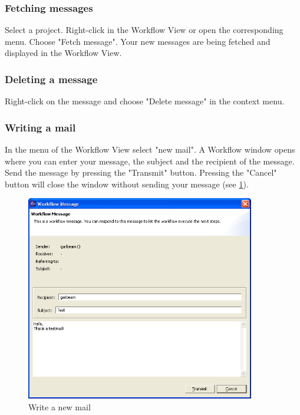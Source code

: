 \subsubsection {Fetching messages}

Select a project. Right-click in the Workflow View or open the corresponding menu. Choose "Fetch message".
Your new messages are being fetched and displayed in the Workflow View.


\subsubsection{Deleting a message}

Right-click on the message and choose "Delete message" in the context menu.


\subsubsection{Writing a mail}

In the menu of the Workflow View select "new mail". A Workflow window opens where
you can enter your message, the subject and the recipient of the message. Send the
message by pressing the "Transmit" button. Pressing the "Cancel" button will close the window
without sending your message (see \ref{writemail}).

\begin{figure}[h!]
\begin{center}
\includegraphics[width=10cm]{writemail.png}
   \caption{Write a new mail}
\label{writemail}
\end{center}
\end{figure}\par

